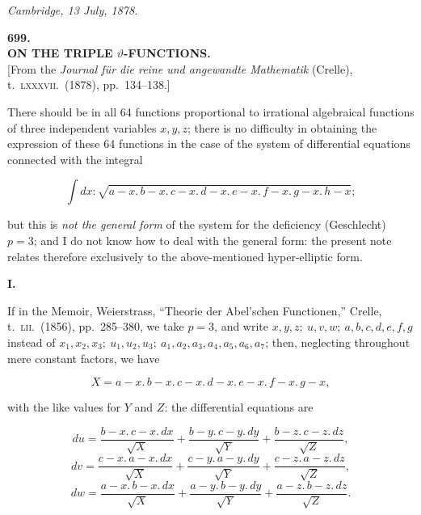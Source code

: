 \documentclass[11pt]{article}
\begin{document}
\medskip
\hfill\textit{Cambridge, 13 July, 1878.}

\bigskip
\begin{center}
\large\textbf{699.}\\[6pt]
\large\textbf{ON THE TRIPLE $\vartheta$-FUNCTIONS.}\\[6pt]
\small [From the \textit{Journal f\"ur die reine und angewandte Mathematik} (Crelle), t.~\textsc{lxxxvii}.~(1878), pp.~134--138.]
\end{center}

\medskip

There should be in all 64 functions proportional to irrational algebraical functions of three independent variables $x, y, z$; there is no difficulty in obtaining the expression of these 64 functions in the case of the system of differential equations connected with the integral

\[
\int dx : \sqrt{a-x.\,b-x.\,c-x.\,d-x.\,e-x.\,f-x.\,g-x.\,h-x};
\]

but this is \textit{not the general form} of the system for the deficiency (Geschlecht) $p=3$; and I do not know how to deal with the general form: the present note relates therefore exclusively to the above-mentioned hyper-elliptic form.

\medskip
\begin{center}\textbf{I.}\end{center}

If in the Memoir, Weierstrass, ``Theorie der Abel'schen Functionen,'' Crelle, t.~\textsc{lii}.~(1856), pp.~285--380, we take $p=3$, and write $x, y, z;\ u, v, w;\ a, b, c, d, e, f, g$ instead of $x_1, x_2, x_3;\ u_1, u_2, u_3;\ a_1, a_2, a_3, a_4, a_5, a_6, a_7$; then, neglecting throughout mere constant factors, we have

\[
X = a-x.\,b-x.\,c-x.\,d-x.\,e-x.\,f-x.\,g-x,
\]

with the like values for $Y$ and $Z$: the differential equations are

\[
du = \frac{b-x.\,c-x.\,dx}{\sqrt{X}} + \frac{b-y.\,c-y.\,dy}{\sqrt{Y}} + \frac{b-z.\,c-z.\,dz}{\sqrt{Z}},
\]
\[
dv = \frac{c-x.\,a-x.\,dx}{\sqrt{X}} + \frac{c-y.\,a-y.\,dy}{\sqrt{Y}} + \frac{c-z.\,a-z.\,dz}{\sqrt{Z}},
\]
\[
dw = \frac{a-x.\,b-x.\,dx}{\sqrt{X}} + \frac{a-y.\,b-y.\,dy}{\sqrt{Y}} + \frac{a-z.\,b-z.\,dz}{\sqrt{Z}}.
\]
\end{document}

